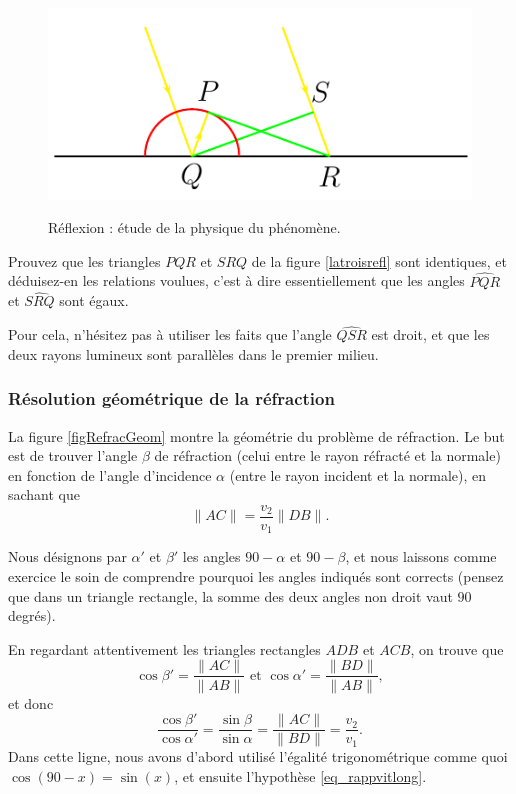 \begin{figure}[ht]
{\includegraphics{fig22788_3.png}
\label{latroisrefl}
}
%
\caption{Réflexion : étude de la physique du phénomène.}\label{fig_refl_pm}
\end{figure}

\begin{exercice}
Prouvez que les triangles $PQR$ et $SRQ$ de la figure \ref{latroisrefl} sont identiques, et déduisez-en les relations voulues, c'est à dire essentiellement que les angles $\widehat{PQR}$ et $\widehat{SRQ}$ sont égaux.

Pour cela, n'hésitez pas à utiliser les faits que l'angle $\widehat{QSR}$ est droit, et que les deux rayons lumineux sont parallèles dans le premier milieu.
\end{exercice}

\subsubsection{Résolution géométrique de la réfraction}

La figure \ref{figRefracGeom} montre la géométrie du problème de réfraction. Le but est de trouver l'angle $\beta$ de réfraction (celui entre le rayon réfracté et la normale) en fonction de l'angle d'incidence $\alpha$ (entre le rayon incident et la normale), en sachant que 
\begin{equation}  \label{eq_rappvitlong}
  \| AC \|=\frac{ v_{2} }{ v_{1} }\| DB \|.
\end{equation}


Nous désignons par $\alpha'$ et $\beta'$ les angles $90-\alpha$ et $90-\beta$, et nous laissons comme exercice le soin de comprendre pourquoi les angles indiqués sont corrects (pensez que dans un triangle rectangle, la somme des deux angles non droit vaut $90$ degrés). 

En regardant attentivement les triangles rectangles $ADB$ et $ACB$, on trouve que 
\[
  \cos\beta'=\frac{ \| AC\| }{ \| AB \| }\text{ et }
  \cos\alpha'=\frac{ \| BD \| }{ \| AB \| },
\]
et donc
\begin{equation}   \label{EqCossinVV}
\frac{ \cos\beta' }{ \cos\alpha' }=\frac{ \sin\beta }{ \sin\alpha }=\frac{ \| AC \| }{ \| BD \| }=\frac{ v_{2} }{ v_{1} }.
\end{equation}
Dans cette ligne, nous avons d'abord utilisé l'égalité trigonométrique comme quoi $\cos(90-x)=\sin(x)$, et ensuite l'hypothèse \eqref{eq_rappvitlong}. 

